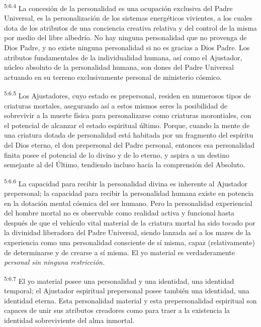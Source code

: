 \par
\textsuperscript{5:6.4} La concesión de la personalidad es una ocupación exclusiva del Padre Universal, es la personalización de los sistemas energéticos vivientes, a los cuales dota de los atributos de una conciencia creativa relativa y del control de la misma por medio del libre albedrío. No hay ninguna personalidad que no provenga de Dios Padre, y no existe ninguna personalidad si no es gracias a Dios Padre. Los atributos fundamentales de la individualidad humana, así como el Ajustador, núcleo absoluto de la personalidad humana, son dones del Padre Universal actuando en su terreno exclusivamente personal de ministerio cósmico.

\par
\textsuperscript{5:6.5} Los Ajustadores, cuyo estado es prepersonal, residen en numerosos tipos de criaturas mortales, asegurando así a estos mismos seres la posibilidad de sobrevivir a la muerte física para personalizarse como criaturas morontiales, con el potencial de alcanzar el estado espiritual último. Porque, cuando la mente de una criatura dotada de personalidad está habitada por un fragmento del espíritu del Dios eterno, el don prepersonal del Padre personal, entonces esa personalidad finita posee el potencial de lo divino y de lo eterno, y aspira a un destino semejante al del Último, tendiendo incluso hacia la comprensión del Absoluto.

\par
\textsuperscript{5:6.6} La capacidad para recibir la personalidad divina es inherente al Ajustador prepersonal; la capacidad para recibir la personalidad humana existe en potencia en la dotación mental cósmica del ser humano. Pero la personalidad experiencial del hombre mortal no es observable como realidad activa y funcional hasta después de que el vehículo vital material de la criatura mortal ha sido tocado por la divinidad liberadora del Padre Universal, siendo lanzada así a los mares de la experiencia como una personalidad consciente de sí misma, capaz (relativamente) de determinarse y de crearse a sí misma. El yo material es verdaderamente \textit{personal sin ninguna restricción.}

\par
\textsuperscript{5:6.7} El yo material posee una personalidad y una identidad, una identidad temporal; el Ajustador espiritual prepersonal posee también una identidad, una identidad eterna. Esta personalidad material y esta prepersonalidad espiritual son capaces de unir sus atributos creadores como para traer a la existencia la identidad sobreviviente del alma inmortal.

